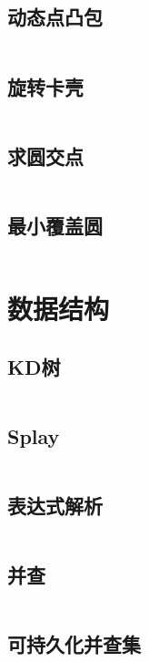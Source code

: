 \documentclass[UTF8]{ctexart}
\begin{document}
\subsection{动态点凸包}
\inputminted{cpp}{calcgeometry/动态点凸包.cpp}

\subsection{旋转卡壳}
\inputminted{cpp}{calcgeometry/旋转卡壳.cpp}

\subsection{求圆交点}
\inputminted{cpp}{calcgeometry/求圆交点.cpp}

\subsection{最小覆盖圆}
\inputminted{cpp}{calcgeometry/最小覆盖圆.cpp}

\section{数据结构}

\subsection{KD树}
\inputminted{cpp}{datastructure/KD树.cpp}

\subsection{Splay}
\inputminted{cpp}{datastructure/Splay.cpp}

\subsection{表达式解析}
\inputminted{cpp}{datastructure/表达式解析.cpp}

\subsection{并查}
\inputminted{cpp}{datastructure/并查.cpp}

\subsection{可持久化并查集}
\inputminted{cpp}{datastructure/可持久化并查集.cpp}
\end{document}

